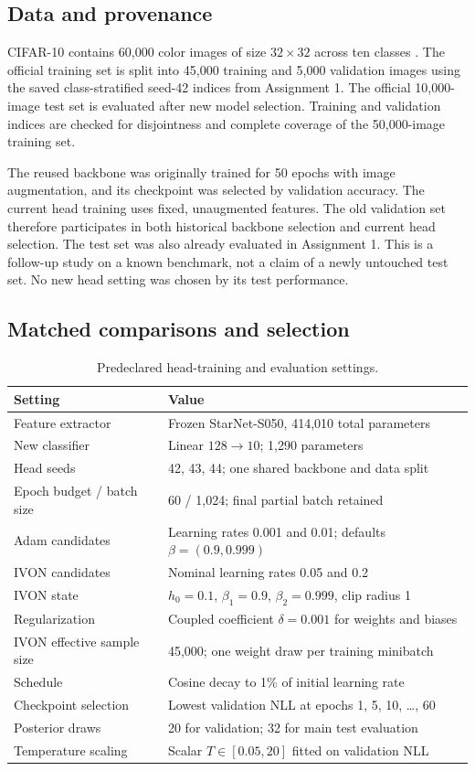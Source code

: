 \documentclass[11pt,a4paper]{article}
\begin{document}
\subsection{Data and provenance}
CIFAR-10 contains 60,000 color images of size $32\times32$ across ten classes
\cite{cifar}. The official training set is split into 45,000 training and 5,000
validation images using the saved class-stratified seed-42 indices from
Assignment 1. The official 10,000-image test set is evaluated after new model
selection. Training and validation indices are checked for disjointness and
complete coverage of the 50,000-image training set.

The reused backbone was originally trained for 50 epochs with image augmentation,
and its checkpoint was selected by validation accuracy. The current head training
uses fixed, unaugmented features. The old validation set therefore participates
in both historical backbone selection and current head selection. The test set
was also already evaluated in Assignment 1. This is a follow-up study on a known
benchmark, not a claim of a newly untouched test set. No new head setting was
chosen by its test performance.

\subsection{Matched comparisons and selection}
\begin{table}[H]\centering\small
\caption{Predeclared head-training and evaluation settings.}
\begin{tabular}{p{}p{}}\toprule
Setting & Value \\\midrule
Feature extractor & Frozen StarNet-S050, 414,010 total parameters \\
New classifier & Linear $128\to10$; 1,290 parameters \\
Head seeds & 42, 43, 44; one shared backbone and data split \\
Epoch budget / batch size & 60 / 1,024; final partial batch retained \\
Adam candidates & Learning rates 0.001 and 0.01; defaults $\beta=(0.9,0.999)$ \\
IVON candidates & Nominal learning rates 0.05 and 0.2 \\
IVON state & $h_0=0.1$, $\beta_1=0.9$, $\beta_2=0.999$, clip radius 1 \\
Regularization & Coupled coefficient $\delta=0.001$ for weights and biases \\
IVON effective sample size & 45,000; one weight draw per training minibatch \\
Schedule & Cosine decay to 1\% of initial learning rate \\
Checkpoint selection & Lowest validation NLL at epochs 1, 5, 10, \ldots, 60 \\
Posterior draws & 20 for validation; 32 for main test evaluation \\
Temperature scaling & Scalar $T\in[0.05,20]$ fitted on validation NLL \\
\bottomrule\end{tabular}\end{table}
\end{document}
